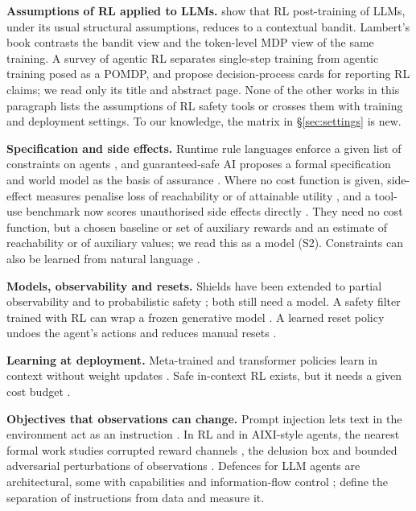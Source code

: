 \documentclass{article}
\begin{document}
\textbf{Assumptions of RL applied to LLMs.} \citet{samineni2025} show that RL post-training of LLMs, under its usual structural assumptions, reduces to a contextual bandit. Lambert's book \citep{lambert2025} contrasts the bandit view and the token-level MDP view of the same training. A survey of agentic RL \citep{zhang2026} separates single-step training from agentic training posed as a POMDP, and \citet{kohli2026} propose decision-process cards for reporting RL claims; we read only its title and abstract page. None of the other works in this paragraph lists the assumptions of RL safety tools or crosses them with training and deployment settings. To our knowledge, the matrix in §\ref{sec:settings} is new.

\textbf{Specification and side effects.} Runtime rule languages enforce a given list of constraints on agents \citep{wang2026}, and guaranteed-safe AI proposes a formal specification and world model as the basis of assurance \citep{dalrymple2024}. Where no cost function is given, side-effect measures penalise loss of reachability or of attainable utility \citep{krakovna2018, turner2020}, and a tool-use benchmark now scores unauthorised side effects directly \citep{huang2026}. They need no cost function, but a chosen baseline or set of auxiliary rewards and an estimate of reachability or of auxiliary values; we read this as a model (S2). Constraints can also be learned from natural language \citep{chua2025}.

\textbf{Models, observability and resets.} Shields have been extended to partial observability \citep{carr2022} and to probabilistic safety \citep{jansen2018}; both still need a model. A safety filter trained with RL can wrap a frozen generative model \citep{pandya2026}. A learned reset policy undoes the agent's actions and reduces manual resets \citep{eysenbach2018}.

\textbf{Learning at deployment.} Meta-trained and transformer policies learn in context without weight updates \citep{duan2016, wang2016, laskin2022}. Safe in-context RL exists, but it needs a given cost budget \citep{moeini2026}.

\textbf{Objectives that observations can change.} Prompt injection lets text in the environment act as an instruction \citep{greshake2023, shapira2026, debenedetti2024, owasp2025}. In RL and in AIXI-style agents, the nearest formal work studies corrupted reward channels \citep{everitt2017}, the delusion box \citep{ring2011} and bounded adversarial perturbations of observations \citep{zhang2020}. Defences for LLM agents are architectural, some with capabilities and information-flow control \citep{beurerkellner2025, debenedetti2025, costa2025}; \citet{zverev2025} define the separation of instructions from data and measure it.
\end{document}
